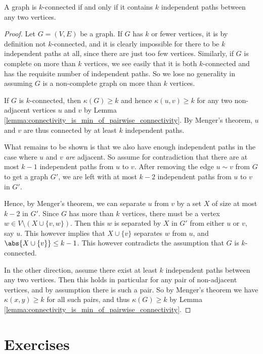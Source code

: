 \documentclass[nobib]{tufte-handout}
\begin{document}
\begin{theorem}
  A graph is $k$-connected if and only if it contains $k$ independent paths between any two vertices.

  \begin{proof}
    Let $G = (V,E)$ be a graph. If $G$ has $k$ or fewer vertices, it is by definition not $k$-connected, and it is clearly impossible for there to be $k$ independent paths at all, since there are just too few vertices. Similarly, if $G$ is complete on more than $k$ vertices, we see easily that it is both $k$-connected and has the requisite number of independent paths. So we lose no generality in assuming $G$ is a non-complete graph on more than $k$ vertices.

    If $G$ is $k$-connected, then $\kappa(G) \geq k$ and hence $\kappa(u,v) \geq k$ for any two non-adjacent vertices $u$ and $v$ by Lemma \ref{lemma:connectivity_is_min_of_pairwise_connectivity}. By Menger's theorem, $u$ and $v$ are thus connected by at least $k$ independent paths.

    What remains to be shown is that we also have enough independent paths in the case where $u$ and $v$ \emph{are} adjacent. So assume for contradiction that there are at most $k-1$ independent paths from $u$ to $v$. After removing the edge $u \sim v$ from $G$ to get a graph $G'$, we are left with at most $k - 2$ independent paths from $u$ to $v$ in $G'$.

    Hence, by Menger's theorem, we can separate $u$ from $v$ by a set $X$ of size at most $k-2$ in $G'$. Since $G$ has more than $k$ vertices, there must be a vertex $w \in V \setminus (X \cup \{v,w\})$. Then this $w$ is separated by $X$ in $G'$ from either $u$ or $v$, say $u$. This however implies that $X \cup \{v\}$ separates $w$ from $u$, and $\abs{X \cup \{v\}} \leq k - 1$. This however contradicts the assumption that $G$ is $k$-connected.

    In the other direction, assume there exist at least $k$ independent paths between any two vertices. Then this holds in particular for any pair of non-adjacent vertices, and by assumption there is such a pair. So by Menger's theorem we have $\kappa(x,y)\geq k$ for all such pairs, and thus $\kappa(G) \geq k$ by Lemma \ref{lemma:connectivity_is_min_of_pairwise_connectivity}.
  \end{proof}
\end{theorem}

\section{Exercises}


%
%
\end{document}
